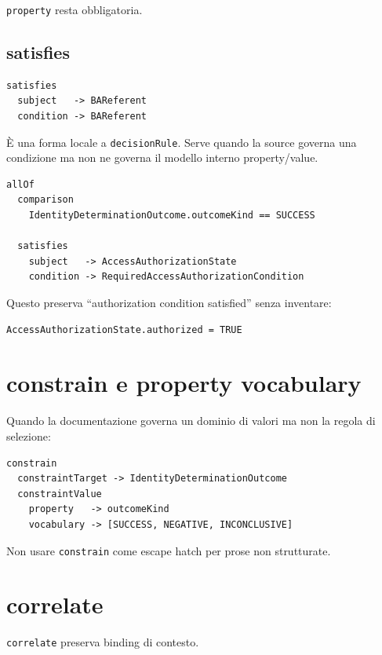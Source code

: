 \documentclass[11pt,a4paper]{article}
\newcommand{\code}[1]{\nolinkurl{#1}}
\begin{document}
\code{property} resta obbligatoria.

\subsection{satisfies}

\begin{lstlisting}
satisfies
  subject   -> BAReferent
  condition -> BAReferent
\end{lstlisting}

È una forma locale a \code{decisionRule}. Serve quando la source governa una condizione ma non ne governa il modello interno property/value.

\begin{examplebox}[FR-1.1]
\begin{lstlisting}
allOf
  comparison
    IdentityDeterminationOutcome.outcomeKind == SUCCESS

  satisfies
    subject   -> AccessAuthorizationState
    condition -> RequiredAccessAuthorizationCondition
\end{lstlisting}

Questo preserva ``authorization condition satisfied'' senza inventare:

\begin{lstlisting}
AccessAuthorizationState.authorized = TRUE
\end{lstlisting}
\end{examplebox}

\section{constrain e property vocabulary}

Quando la documentazione governa un dominio di valori ma non la regola di selezione:

\begin{lstlisting}
constrain
  constraintTarget -> IdentityDeterminationOutcome
  constraintValue
    property   -> outcomeKind
    vocabulary -> [SUCCESS, NEGATIVE, INCONCLUSIVE]
\end{lstlisting}

Non usare \code{constrain} come escape hatch per prose non strutturate.

\section{correlate}

\code{correlate} preserva binding di contesto.
\end{document}
